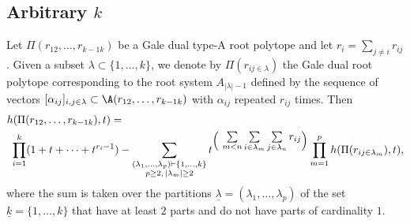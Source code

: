 \subsection{Arbitrary \texorpdfstring{$k$}{k}}
\begin{theorem}\label{main:h-poly} 
Let $\Pi(r_{12}, \ldots ,r_{k-1 k})$ be a Gale dual type-A root polytope and let $r_i=\sum_{j\neq i}r_{ij}$. Given a subset $\lambda\subset\{1, \ldots ,k\}$, we denote by $\Pi({r}_{ij\in\lambda})$ the Gale dual  root polytope corresponding to the root system $A_{|\lambda|-1}$ defined by  the sequence of vectors $[\alpha_{ij}]_{i,j\in\lambda} \subset \A(r_{12}, \ldots ,r_{k-1 k})$ with $\alpha_{ij}$ repeated $r_{ij}$ times. Then 
\begin{align*}
&h(\Pi(r_{12}, \ldots ,r_{k-1 k}),t) = \\
&\ \prod_{i=1}^k (1+t+ \cdots +t^{r_i-1}) - 
 \sum_{\substack{(\lambda_1, \ldots ,\lambda_p)\vdash\{1, \ldots ,k\} \\ p\geq 2, \, |\lambda_m|\geq 2}}t^{\Big( \vcenter{\hbox{ $\sum\limits_{m<n}\sum\limits_{i\in \lambda_m}\sum\limits_{j\in \lambda_n}r_{ij}$}} \Big)}\prod_{m=1}^ph(\Pi({r}_{ij\in\lambda_m}),t),
\end{align*}
where the sum is taken over the partitions $\underline{\lambda}=(\lambda_1, \ldots ,\lambda_p)$ of the set $\underline{k}=\{1, \ldots ,k\}$ that have at least $2$ parts and do not have parts of cardinality $1$.
\end{theorem}
